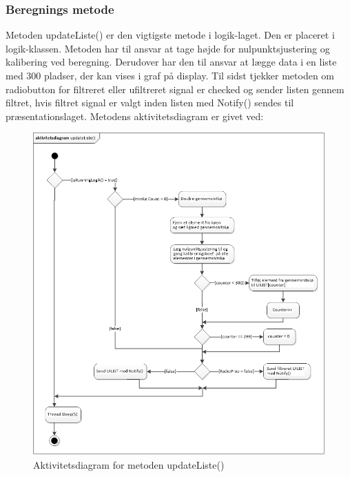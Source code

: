 \subsubsection{Beregnings metode}
Metoden updateListe() er den vigtigste metode i logik-laget. Den er placeret i logik-klassen. Metoden har til ansvar at tage højde for nulpunktsjustering og kalibering ved beregning. Derudover har den til ansvar at lægge data i en liste med 300 pladser, der kan vises i graf på display. Til sidst tjekker metoden om radiobutton for filtreret eller ufiltreret signal er checked og sender listen gennem filtret, hvis filtret signal er valgt inden listen med Notify() sendes til præsentationslaget. Metodens aktivitetsdiagram er givet ved:
\begin{figure}[H]
	\centering
	\includegraphics[width=1.0\textwidth]{Figurer/AktUpdateListe}
	\caption{Aktivitetsdiagram for metoden updateListe()}
	\label{fig:Aktivitetsdiagram_updateListe}
\end{figure}

